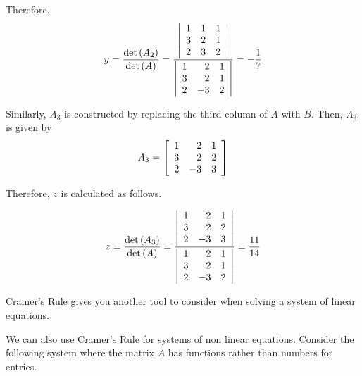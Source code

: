 \begin{solution}
Therefore, 
\begin{equation*}
y=\vspace{0.05in}\frac{\det \left(A_{2}\right)}{\det \left(A\right)} = \vspace{0.05in}\frac{\left|
\begin{array}{rrr}
1 & 1 & 1 \\
3 & 2 & 1 \\
2 & 3 & 2
\end{array}
\right| }{\left|
\begin{array}{rrr}
1 & 2 & 1 \\
3 & 2 & 1 \\
2 & -3 & 2
\end{array}
\right| }=-\vspace{0.05in}\frac{1}{7}
\end{equation*}

Similarly, $A_3$ is constructed by replacing the third column of $A$ with $B$. Then, $A_3$ is given by
\begin{equation*}
A_3
=
\left[
\begin{array}{rrr}
1 & 2 & 1 \\
3 & 2 & 2 \\
2 & -3 & 3
\end{array}
\right]
\end{equation*}

Therefore, $z$ is calculated as follows. 

\begin{equation*}
z=
\vspace{0.05in}\frac{\det \left(A_{3}\right)}{\det \left(A\right)}
=
\frac{\left|
\begin{array}{rrr}
1 & 2 & 1 \\
3 & 2 & 2 \\
2 & -3 & 3
\end{array}
\right| }{\left|
\begin{array}{rrr}
1 & 2 & 1 \\
3 & 2 & 1 \\
2 & -3 & 2
\end{array}
\right| }=\frac{11}{14}
\end{equation*}
\end{solution}

Cramer's Rule gives you another tool to consider when solving a system of linear equations.

We can also use Cramer's Rule for systems of non linear equations. Consider the following system 
where the matrix $A$ has functions rather than numbers for entries. 

